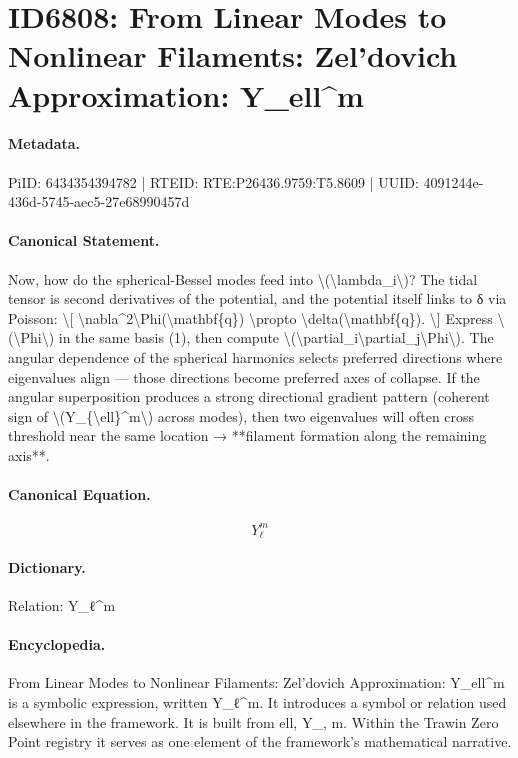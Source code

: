 \section*{ID6808: From Linear Modes to Nonlinear Filaments: Zel’dovich Approximation: Y\_ell\textasciicircum{}m}
\paragraph{Metadata.}
PiID: 6434354394782 | RTEID: RTE:P26436.9759:T5.8609 | UUID: 4091244e-436d-5745-aec5-27e68990457d

\paragraph{Canonical Statement.}
Now, how do the spherical-Bessel modes feed into \textbackslash{}(\textbackslash{}lambda\_i\textbackslash{})? The tidal tensor is second derivatives of the potential, and the potential itself links to δ via Poisson: \textbackslash{}[ \textbackslash{}nabla\textasciicircum{}2\textbackslash{}Phi(\textbackslash{}mathbf\{q\}) \textbackslash{}propto \textbackslash{}delta(\textbackslash{}mathbf\{q\}). \textbackslash{}] Express \textbackslash{}(\textbackslash{}Phi\textbackslash{}) in the same basis (1), then compute \textbackslash{}(\textbackslash{}partial\_i\textbackslash{}partial\_j\textbackslash{}Phi\textbackslash{}). The angular dependence of the spherical harmonics selects preferred directions where eigenvalues align — those directions become preferred axes of collapse. If the angular superposition produces a strong directional gradient pattern (coherent sign of \textbackslash{}(Y\_\{\textbackslash{}ell\}\textasciicircum{}m\textbackslash{}) across modes), then two eigenvalues will often cross threshold near the same location → **filament formation along the remaining axis**.

\paragraph{Canonical Equation.}
\[
Y_{\ell}^m
\]

\paragraph{Dictionary.}
Relation: Y\_ℓ\textasciicircum{}m

\paragraph{Encyclopedia.}
From Linear Modes to Nonlinear Filaments: Zel’dovich Approximation: Y\_ell\textasciicircum{}m is a symbolic expression, written Y\_ℓ\textasciicircum{}m. It introduces a symbol or relation used elsewhere in the framework. It is built from ell, Y\_, m. Within the Trawin Zero Point registry it serves as one element of the framework's mathematical narrative.
